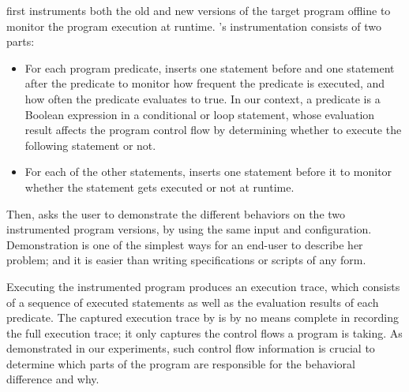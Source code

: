 \ourtool first instruments both the old and new versions
of the target program offline to monitor
the program  execution at runtime. \ourtool's instrumentation
consists of two parts:

\vspace{-2mm}

\begin{itemize}
\item For each program predicate, \ourtool inserts one
statement before and one statement after the predicate
to monitor how frequent the predicate is executed, and
how often the predicate evaluates to true. In our
context, a predicate is a Boolean expression in a
conditional or loop statement,
whose evaluation result affects the program
control flow by determining whether to execute the
following statement or not.


\item For each of the other statements, \ourtool inserts
one statement before it to monitor whether the statement
gets executed or not at runtime.
\end{itemize}


\vspace{-1mm}

Then, \ourtool asks the user to demonstrate the different
behaviors on the two instrumented program versions, by using
the same input and configuration. Demonstration is
one of the simplest ways for an end-user to describe her problem;
and it is easier than writing specifications or scripts of any form.

Executing the instrumented program produces an execution trace,
which consists of a sequence of executed statements as well
as the evaluation results of each predicate.
The captured execution trace by \ourtool is by no means complete
in recording the full execution trace;  it only
captures the control flows a program is taking. As demonstrated
in our experiments, such control flow information is
crucial to determine which parts of the program are
responsible for the behavioral difference and why.



